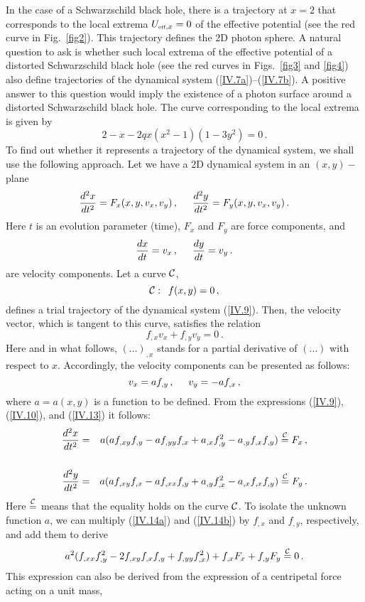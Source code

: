 \documentclass[twocolumn,showpacs,preprintnumbers,amsmath,amssymb,floatfix,nofootinbib]{revtex4-1}
\newcommand{\be}{\begin{equation}}
\newcommand{\ee}{\end{equation}}
\newcommand{\ba}{\begin{eqnarray}}
\newcommand{\ea}{\end{eqnarray}}
\newcommand{\non}{\nonumber}
\newcommand{\eq}[1]{(\ref{#1})}
\newcommand{\n}[1]{\label{#1}}
\newcommand{\hhh}{\, ,\hspace{0.5cm}}
\newcommand{\ind}[1]{\mbox{\tiny #1}}
\begin{document}
In the case of a Schwarzschild black hole, there is a trajectory at $x=2$ that corresponds to the local extrema $U_{\ind{eff},x}=0$ of the effective potential (see the red curve in Fig.~\ref{fig2}). This trajectory defines the 2D photon sphere. A natural question to ask is whether such local extrema of the effective potential of a distorted Schwarzschild black hole (see the red curves in Figs.~\ref{fig3} and \ref{fig4}) also define trajectories of the dynamical system \eq{IV.7a}--\eq{IV.7b}. A positive answer to this question would imply the existence of a photon surface around a distorted Schwarzschild black hole. The curve corresponding to the local extrema is given by
\be\n{IV.8}
2-x-2qx(x^2-1)(1-3y^2)=0\,.
\ee
To find out whether it represents a trajectory of the dynamical system, we shall use the following approach. Let we have a 2D dynamical system in an $(x,y)-$plane
\be\n{IV.9}
\frac{d^2x}{dt^2}=F_x(x,y,v_x,v_y)\hhh \frac{d^2y}{dt^2}=F_y(x,y,v_x,v_y)\,.
\ee
Here $t$ is an evolution parameter (time), $F_x$ and $F_y$ are force components, and
\be\n{IV.10}
\frac{dx}{dt}=v_x\hhh \frac{dy}{dt}=v_y\,.
\ee
are velocity components. Let a curve ${\cal C}$,
\be\n{IV.11} 
{\cal C}:\,\,\,f(x,y)=0\,,
\ee
defines a trial trajectory of the dynamical system \eq{IV.9}. Then, the velocity vector, which is tangent to this curve, satisfies the relation
\be\n{IV.12}
f_{,x}v_x+f_{,y}v_y=0\,.
\ee
Here and in what follows, $(\ldots)_{,x}$ stands for a partial derivative of $(\ldots)$ with respect to $x$. Accordingly, the velocity components can be presented as follows:
\be\n{IV.13}
v_x=af_{,y}\hhh v_y=-af_{,x}\,,
\ee  
where $a=a(x,y)$ is a function to be defined. From the expressions \eq{IV.9}, \eq{IV.10}, and \eq{IV.13} it follows:
\ba
\frac{d^2x}{dt^2}&=&a(af_{,xy}f_{,y}-af_{,yy}f_{,x}+a_{,x}f_{,y}^2-a_{,y}f_{,x}f_{,y})\stackrel{\mathrm{\cal C}}{=}F_x\,,\non\\
\n{IV.14a}\\
\frac{d^2y}{dt^2}&=&a(af_{,xy}f_{,x}-af_{,xx}f_{,y}+a_{,y}f_{,x}^2-a_{,x}f_{,x}f_{,y})\stackrel{\mathrm{\cal C}}{=}F_y\,.\non\\
\n{IV.14b}
\ea 
Here $\stackrel{\mathrm{\cal C}}{=}$ means that the equality holds on the curve ${\cal C}$. To isolate the unknown function $a$, we can multiply \eq{IV.14a} and \eq{IV.14b} by $f_{,x}$ and $f_{,y}$, respectively, and add them to derive
\be\n{IV.15}
a^2(f_{,xx}f_{,y}^2-2f_{,xy}f_{,x}f_{,y}+f_{,yy}f_{,x}^2)+f_{,x}F_x+f_{,y}F_y\stackrel{\mathrm{\cal C}}{=}0\,.
\ee
This expression can also be derived from the expression of a centripetal force acting on a unit mass,
\end{document}
